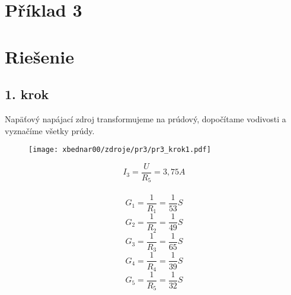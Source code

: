 \section{Příklad 3}

\section*{Riešenie}
\subsection*{1. krok}
Napäťový napájací zdroj transformujeme na prúdový, dopočítame vodivosti a vyznačíme všetky prúdy.\\
\begin{figure}[ht]
\begin{minipage}{0.5\linewidth}
\centering
\texttt{[image: xbednar00/zdroje/pr3/pr3\_krok1.pdf]}
\end{minipage}
\begin{minipage}{0.5\linewidth}
    $$I_3=\frac{U}{R_5}=3,75A$$\\
    $$G_1=\frac{1}{R_1}=\frac{1}{53}S$$
    $$G_2=\frac{1}{R_2}=\frac{1}{49}S$$
    $$G_3=\frac{1}{R_3}=\frac{1}{65}S$$ 
    $$G_4=\frac{1}{R_4}=\frac{1}{39}S$$
    $$G_5=\frac{1}{R_5}=\frac{1}{32}S$$
\end{minipage}
\end{figure}

\newpage

